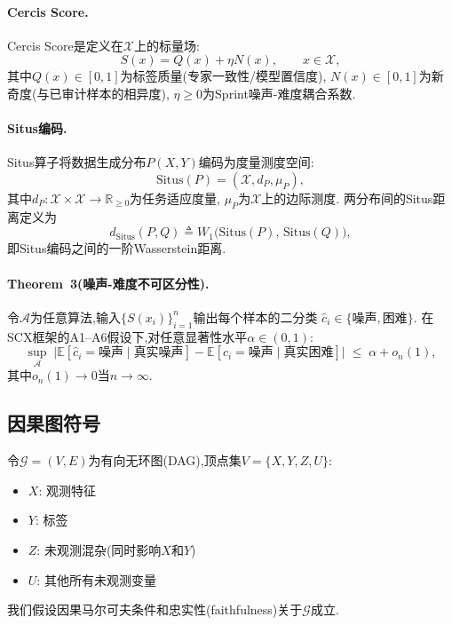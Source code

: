\documentclass[12pt,a4paper]{article}
\newcommand{\R}{\mathbb{R}}
\newcommand{\E}{\mathbb{E}}
\newcommand{\cX}{\mathcal{X}}
\newcommand{\cG}{\mathcal{G}}
\newcommand{\cA}{\mathcal{A}}
\newcommand{\Situs}{\mathrm{Situs}}
\newcommand{\defeq}{\triangleq}
\begin{document}
\paragraph{Cercis Score.}
Cercis Score是定义在$\cX$上的标量场:
\begin{equation}\label{eq:cercis-def}
    S(x) = Q(x) + \eta N(x),\qquad x \in \cX,
\end{equation}
其中$Q(x) \in [0,1]$为标签质量(专家一致性/模型置信度),
$N(x) \in [0,1]$为新奇度(与已审计样本的相异度),
$\eta \geq 0$为Sprint噪声-难度耦合系数.

\paragraph{Situs编码.}
Situs算子将数据生成分布$P(X,Y)$编码为度量测度空间:
\begin{equation}\label{eq:situs-def}
    \Situs(P) = (\cX, d_P, \mu_P),
\end{equation}
其中$d_P: \cX \times \cX \to \R_{\geq 0}$为任务适应度量,
$\mu_P$为$\cX$上的边际测度.
两分布间的Situs距离定义为
\begin{equation}\label{eq:situs-dist}
    d_{\Situs}(P, Q) \defeq W_1\big(\Situs(P),\, \Situs(Q)\big),
\end{equation}
即Situs编码之间的一阶Wasserstein距离.

\paragraph{Theorem~3(噪声-难度不可区分性).}
令$\cA$为任意算法,输入$\{S(x_i)\}_{i=1}^n$输出每个样本的二分类
$\hat{c}_i \in \{\text{噪声},\text{困难}\}$.
在SCX框架的A1--A6假设下,对任意显著性水平$\alpha \in (0,1)$:
\begin{equation}\label{eq:thm3-statement}
    \sup_{\cA}\; \big|\E[\hat{c}_i = \text{噪声} \mid \text{真实噪声}]
    - \E[\hat{c}_i = \text{噪声} \mid \text{真实困难}]\big|
    \;\leq\; \alpha + o_n(1),
\end{equation}
其中$o_n(1) \to 0$当$n \to \infty$.

\subsection{因果图符号}

令$\cG = (V, E)$为有向无环图(DAG),顶点集$V = \{X, Y, Z, U\}$:
\begin{itemize}
    \item $X$: 观测特征
    \item $Y$: 标签
    \item $Z$: 未观测混杂(同时影响$X$和$Y$)
    \item $U$: 其他所有未观测变量
\end{itemize}
我们假设因果马尔可夫条件和忠实性(faithfulness)关于$\cG$成立.
\end{document}
